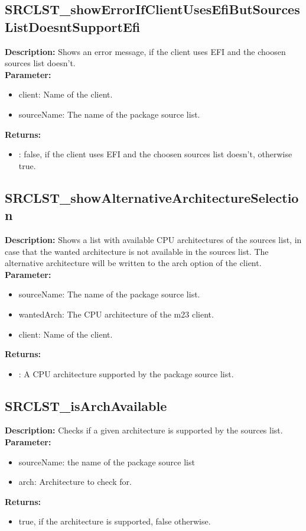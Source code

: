 \subsection{SRCLST\_showErrorIfClientUsesEfiButSourcesListDoesntSupportEfi}
\textbf{Description:} Shows an error message, if the client uses EFI and the choosen sources list doesn't.\\
\textbf{Parameter:}
\begin{itemize}
\item client: Name of the client.
\item sourceName: The name of the package source list.
\end{itemize}
\textbf{Returns:}
\begin{itemize}
\item : false, if the client uses EFI and the choosen sources list doesn't, otherwise true.
\end{itemize}

\subsection{SRCLST\_showAlternativeArchitectureSelection}
\textbf{Description:} Shows a list with available CPU architectures of the sources list, in case that the wanted architecture is not available in the sources list. The alternative architecture will be written to the arch option of the client.\\
\textbf{Parameter:}
\begin{itemize}
\item sourceName: The name of the package source list.
\item wantedArch: The CPU architecture of the m23 client.
\item client: Name of the client.
\end{itemize}
\textbf{Returns:}
\begin{itemize}
\item : A CPU architecture supported by the package source list.
\end{itemize}

\subsection{SRCLST\_isArchAvailable}
\textbf{Description:} Checks if a given architecture is supported by the sources list.\\
\textbf{Parameter:}
\begin{itemize}
\item sourceName: the name of the package source list
\item arch: Architecture to check for.
\end{itemize}
\textbf{Returns:}
\begin{itemize}
\item true, if the architecture is supported, false otherwise.
\end{itemize}

